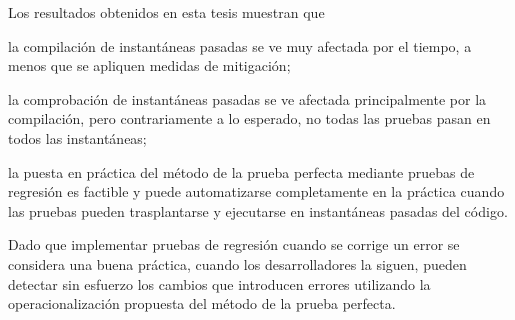 Los resultados obtenidos en esta tesis muestran que 
\begin{inparaenum}[a)]
    \item la compilación de instantáneas pasadas se ve muy afectada por el tiempo, a menos que se apliquen medidas de mitigación; 
    \item la comprobación de instantáneas pasadas se ve afectada principalmente por la compilación, pero contrariamente a lo esperado, no todas las pruebas pasan en todos las instantáneas;
    \item la puesta en práctica del método de la prueba perfecta mediante pruebas de regresión es factible y puede automatizarse completamente en la práctica cuando las pruebas pueden trasplantarse y ejecutarse en instantáneas pasadas del código.
\end{inparaenum}
Dado que implementar pruebas de regresión cuando se corrige un error se considera una buena práctica, cuando los desarrolladores la siguen, pueden detectar sin esfuerzo los cambios que introducen errores utilizando la operacionalización propuesta del método de la prueba perfecta.
